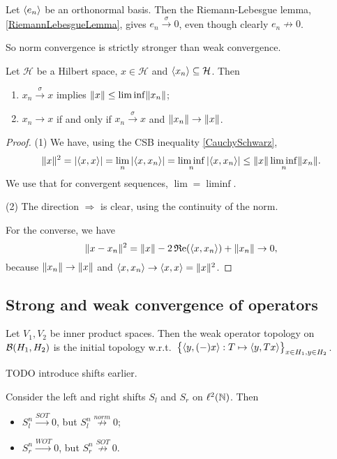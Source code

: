 \begin{example}
Let $\left\langle e_n \right\rangle$ be an orthonormal basis. Then the Riemann-Lebesgue lemma, \ref{RiemannLebesgueLemma}, gives $e_n \overset{\sigma}{\longrightarrow} 0$, even though clearly $e_n \not\to 0$.
\end{example}

So norm convergence is strictly stronger than weak convergence.

\begin{proposition} \label{weakHilbertSpaceConvergence}
Let $\mathcal{H}$ be a Hilbert space, $x\in \mathcal{H}$ and $\left\langle x_n \right\rangle\subseteq \mathcal{H}$. Then
\begin{enumerate}
\item $x_n \overset{\sigma}{\longrightarrow} x$ implies $\lVert x\rVert \leq \liminf \lVert x_n\rVert$;
\item $x_n \longrightarrow x$ \textup{if and only if} $x_n \overset{\sigma}{\longrightarrow} x$ and $\lVert x_n\rVert\to \lVert x\rVert$.
\end{enumerate}
\end{proposition}
\begin{proof}
(1) We have, using the CSB inequality \ref{CauchySchwarz},
\[ \norm{x}^2 = |\inner{x,x}| = \lim_n |\inner{x,x_n}| = \liminf_n|\inner{x,x_n}| \leq \norm{x}\liminf_n\norm{x_n}. \]
We use that for convergent sequences, $\lim = \liminf$.

(2) The direction $\Rightarrow$ is clear, using the continuity of the norm.

For the converse, we have
\[ \norm{x-x_n}^2 = \norm{x}-2\Re(\inner{x,x_n}) + \norm{x_n} \to 0, \]
because $\lVert x_n\rVert \to \lVert x\rVert$ and $\inner{x,x_n} \to \inner{x,x} = \norm{x}^2$.
\end{proof}


\subsection{Strong and weak convergence of operators}
\begin{lemma}
Let $V_1,V_2$ be inner product spaces. Then the weak operator topology on $\operatorname{\mathcal{B}}(H_1,H_2)$ is the initial topology w.r.t.\ $\big\{\inner{y, (-)x}: T\mapsto \inner{y,Tx}\big\}_{x\in H_1, y\in H_2}$.
\end{lemma}

TODO introduce shifts earlier. \label{adjointMapNotSOTContinuous}
\begin{example}
Consider the left and right shifts $S_l$ and $S_r$ on $\ell^2(\mathbb{N})$. Then
\begin{itemize}
\item $S_l^n \overset{SOT}{\longrightarrow} 0$, but $S_l^n \overset{norm}{\not\longrightarrow} 0$;
\item $S_r^n \overset{WOT}{\longrightarrow} 0$, but $S_r^n \overset{SOT}{\not\longrightarrow} 0$.
\end{itemize}
\end{example}

